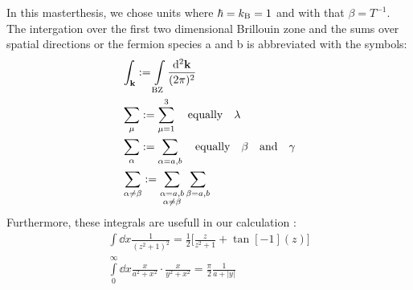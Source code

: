 In this masterthesis, we chose units where $\hbar = k_{\mathrm{B}} = 1$ and with that $\beta = T^{-1}$.
The intergation over the first two dimensional Brillouin zone and the sums over spatial directions or the fermion species a and b is abbreviated with the symbols:
%
\begin{align}
	&\int_{\vb{k}} := \int\limits_{\mt{BZ}} \frac{\dd[2]{\vb{k}}}{(2\pi)^{2}}
	\\
	&\sum\limits_{\mu} := \sum\limits_{\mu = 1}^{3} \qq{equally} \lambda
	\\
	&\sum\limits_{\alpha} := \sum\limits_{\alpha = a,b} \qq{equally} \beta \qq{and} \gamma
	\\
	&\sum\limits_{\alpha\neq\beta} := \sum\limits_{\substack{\alpha = a,b \\ \alpha\neq\beta}} \sum_{\beta = a,b}
\end{align}
%
Furthermore, these integrals are usefull in our calculation \cite{Bronstein}:
%
\begin{align}
	\int \dd{x} \frac{1}{(z^{2} + 1)^{2}} = \frac{1}{2}\Big[\frac{z}{z^2 + 1} + \tan[-1](z)\Big]
	\label{eq:integral1}
	\\
	\int\limits_{0}^{\infty} \dd{x} \frac{x}{a^{2} + x^{2}} \cdot \frac{x}{y^{2} + x^{2}} = \frac{\pi}{2} \frac{1}{a + |y|}
	\label{eq:integral2}
\end{align}
%




































